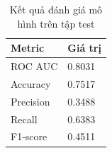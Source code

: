 \begin{table}[H]
  \centering
  \caption{Kết quả đánh giá mô hình trên tập test}
  \begin{tabular}{@{}ll@{}}
    \toprule
    \textbf{Metric} & \textbf{Giá trị} \\
    \midrule
    ROC AUC   & 0.8031 \\
    Accuracy  & 0.7517 \\
    Precision & 0.3488 \\
    Recall    & 0.6383 \\
    F1-score  & 0.4511 \\
    \bottomrule
  \end{tabular}
\end{table}
